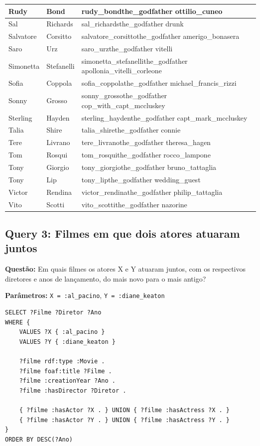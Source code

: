 \documentclass[12pt,a4paper]{article}
\begin{document}
\begin{longtable}{|l|l|p{6cm}|}
Rudy & Bond & rudy\_bondthe\_godfather ottilio\_cuneo \\
\hline
Sal & Richards & sal\_richardsthe\_godfather drunk \\
\hline
Salvatore & Corsitto & salvatore\_corsittothe\_godfather amerigo\_bonasera \\
\hline
Saro & Urz & saro\_urzthe\_godfather vitelli \\
\hline
Simonetta & Stefanelli & simonetta\_stefanellithe\_godfather apollonia\_vitelli\_corleone \\
\hline
Sofia & Coppola & sofia\_coppolathe\_godfather michael\_francis\_rizzi \\
\hline
Sonny & Grosso & sonny\_grossothe\_godfather cop\_with\_capt\_mccluskey \\
\hline
Sterling & Hayden & sterling\_haydenthe\_godfather capt\_mark\_mccluskey \\
\hline
Talia & Shire & talia\_shirethe\_godfather connie \\
\hline
Tere & Livrano & tere\_livranothe\_godfather theresa\_hagen \\
\hline
Tom & Rosqui & tom\_rosquithe\_godfather rocco\_lampone \\
\hline
Tony & Giorgio & tony\_giorgiothe\_godfather bruno\_tattaglia \\
\hline
Tony & Lip & tony\_lipthe\_godfather wedding\_guest \\
\hline
Victor & Rendina & victor\_rendinathe\_godfather philip\_tattaglia \\
\hline
Vito & Scotti & vito\_scottithe\_godfather nazorine \\
\hline
\end{longtable}
\newpage
\subsection{Query 3: Filmes em que dois atores atuaram juntos}

\textbf{Questão:} Em quais filmes os atores X e Y atuaram juntos, com os respectivos diretores e anos de lançamento, do mais novo para o mais antigo?

\textbf{Parâmetros:} \texttt{X = :al\_pacino}, \texttt{Y = :diane\_keaton}

\begin{lstlisting}
SELECT ?Filme ?Diretor ?Ano
WHERE {
    VALUES ?X { :al_pacino }
    VALUES ?Y { :diane_keaton }
    
    ?filme rdf:type :Movie .
    ?filme foaf:title ?Filme .
    ?filme :creationYear ?Ano .
    ?filme :hasDirector ?Diretor .
    
    { ?filme :hasActor ?X . } UNION { ?filme :hasActress ?X . }
    { ?filme :hasActor ?Y . } UNION { ?filme :hasActress ?Y . }
}
ORDER BY DESC(?Ano)
\end{lstlisting}
\end{document}
